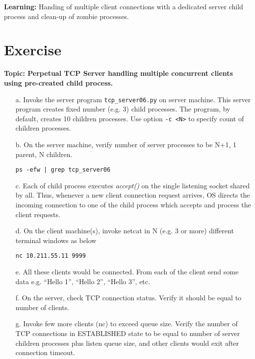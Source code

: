 \begin{multicols}{2}
\begin{itemize}
\end{itemize}

\textbf{Learning:} Handing of multiple client connections with a dedicated server child process and clean-up of zombie processes.

\section*{Exercise \label{chap1-exe04}}

\textbf{Topic:  Perpetual TCP Server handling multiple concurrent clients using pre-created child process.}

\begin{itemize}

\item[a.] Invoke the server program \texttt{tcp\_server06.py} on server machine. This server program creates fixed number (e.g. 3) child processes. The program, by default, creates 10 children processes. Use option \texttt{-c <N>} to specify count of children processes.

\item[b.] On the server machine, verify number of server processes to be N+1, 1 parent, N children.

\texttt{ps -efw | grep tcp\_server06}

\item[c.] Each of child process executes \textit{accept()} on the single listening socket shared by all. Thus, whenever a new client connection request arrives, OS directs the incoming connection to one of the child process which accepts and process the client requests.

\item[d.] On the client machine(s), invoke netcat in N (e.g. 3 or more) different terminal windows as below

\texttt{nc 10.211.55.11 9999}

\item[e.] All these clients would be connected. From each of the client send some data e.g. “Hello 1”, “Hello 2”, “Hello 3”, etc.

\item[f.] On the server, check TCP connection status.  Verify it should be equal to number of clients.

\item[g.] Invoke few more clients (nc) to exceed queue size. Verify the number of TCP connections in ESTABLISHED state to be equal to number of server children processes plus listen queue size, and other clients would exit after connection timeout.
\end{itemize}


\end{multicols}
